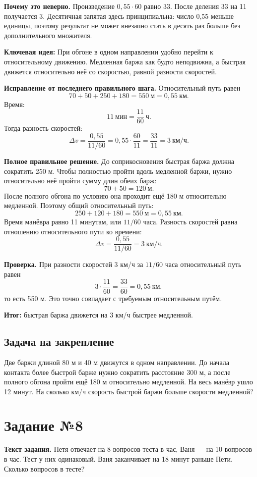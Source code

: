 \documentclass[12pt,a4paper]{article}
\newcommand{\keyidea}[1]{\textcolor{ideablue}{\textbf{Ключевая идея:}} #1}
\newcommand{\finalresult}[1]{\textcolor{resultteal}{\textbf{Итог:}} #1}
\begin{document}
\textbf{Почему это неверно.} Произведение $0{,}55\cdot60$ равно 33. После деления 33 на 11 получается 3. Десятичная запятая здесь принципиальна: число 0,55 меньше единицы, поэтому результат не может внезапно стать в десять раз больше без дополнительного множителя.

\keyidea{При обгоне в одном направлении удобно перейти к относительному движению. Медленная баржа как будто неподвижна, а быстрая движется относительно неё со скоростью, равной разности скоростей.}

\textbf{Исправление от последнего правильного шага.} Относительный путь равен
\[
70+50+250+180=550\ \text{м}=0{,}55\ \text{км}.
\]
Время:
\[
11\ \text{мин}=\frac{11}{60}\ \text{ч}.
\]
Тогда разность скоростей:
\[
\Delta v=\frac{0{,}55}{11/60}=0{,}55\cdot\frac{60}{11}=\frac{33}{11}=3\ \text{км/ч}.
\]

\textbf{Полное правильное решение.} До соприкосновения быстрая баржа должна сократить 250 м. Чтобы полностью пройти вдоль медленной баржи, нужно относительно неё пройти сумму длин обеих барж:
\[
70+50=120\ \text{м}.
\]
После полного обгона по условию она проходит ещё 180 м относительно медленной. Поэтому общий относительный путь:
\[
250+120+180=550\ \text{м}=0{,}55\ \text{км}.
\]
Время манёвра равно 11 минутам, или $11/60$ часа. Разность скоростей равна отношению относительного пути ко времени:
\[
\Delta v=\frac{0{,}55}{11/60}=3\ \text{км/ч}.
\]

\textbf{Проверка.} При разности скоростей 3 км/ч за $11/60$ часа относительный путь равен
\[
3\cdot\frac{11}{60}=\frac{33}{60}=0{,}55\ \text{км},
\]
то есть 550 м. Это точно совпадает с требуемым относительным путём.

\finalresult{быстрая баржа движется на 3 км/ч быстрее медленной.}

\subsection*{Задача на закрепление}
Две баржи длиной 80 м и 40 м движутся в одном направлении. До начала контакта более быстрой барже нужно сократить расстояние 300 м, а после полного обгона пройти ещё 180 м относительно медленной. На весь манёвр ушло 12 минут. На сколько км/ч скорость быстрой баржи больше скорости медленной?

\newpage
{}\label{task:8}
\section*{Задание №8}
\textbf{Текст задания.} Петя отвечает на 8 вопросов теста в час, Ваня --- на 10 вопросов в час. Тест у них одинаковый. Ваня заканчивает на 18 минут раньше Пети. Сколько вопросов в тесте?
\end{document}
